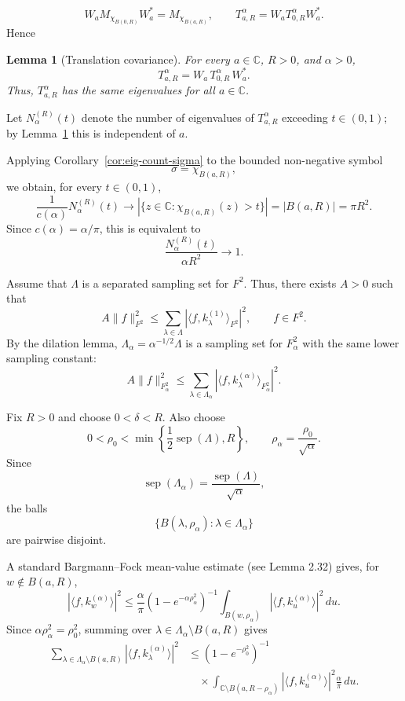 \documentclass{amsart}
\newtheorem{lem}[thm]{Lemma}
\theoremstyle{definition}
\theoremstyle{remark}
\numberwithin{equation}{section}
\newcommand{\C}{\mathbb{C}} %
\newcommand{\Weyl}{W}
\begin{document}
\[W_a M_{\chi_{B(0,R)}}W_a^*
=M_{\chi_{B(a,R)}},
\qquad
T_{a,R}^\alpha
=W_aT_{0,R}^\alpha W_a^*.\]
Hence

\begin{lem}[Translation covariance]
\label{lem:WeylBall}
For every $a\in\C$, $R>0$, and $\alpha>0$,
\[
T^\alpha_{a,R}
=\Weyl_{a}\,T^\alpha_{0,R}\,\Weyl_{a}^{*}.
\]
Thus, $T^\alpha_{a,R}$ has the same eigenvalues for all $a\in\C$.
\end{lem}

Let $N_\alpha^{(R)}(t)$ denote the number of eigenvalues of $T^\alpha_{a,R}$
exceeding $t\in(0,1)$; by Lemma~\ref{lem:WeylBall} this is independent of $a$.

Applying Corollary~\ref{cor:eig-count-sigma} to the bounded non-negative symbol
\[
\sigma=\chi_{B(a,R)},
\]
we obtain, for every $t\in(0,1)$,
\[
\frac{1}{c(\alpha)}
N_\alpha^{(R)}(t)
\longrightarrow
|\{z\in\mathbb C:\chi_{B(a,R)}(z)>t\}|
=
|B(a,R)|
=
\pi R^2.
\]
Since $c(\alpha)=\alpha/\pi$, this is equivalent to
\begin{equation}\label{eq:FockEigenvalueCounting}
\frac{N_\alpha^{(R)}(t)}{\alpha R^2}
\longrightarrow1.
\end{equation}



Assume that $\Lambda$ is a separated sampling set for $F^2$.
Thus, there exists $A>0$ such that
\[
A\|f\|_{F^2}^2
\leq
\sum_{\lambda\in\Lambda}
|\langle f,k_\lambda^{(1)}\rangle_{F^2}|^2,
\qquad
f\in F^2.
\]
By the dilation lemma, $\Lambda_\alpha
=\alpha^{-1/2}\Lambda$ is a sampling set for $F_\alpha^2$ with the
same lower sampling constant:
\[
A\|f\|_{F_\alpha^2}^2
\leq
\sum_{\lambda\in\Lambda_\alpha}
|\langle f,k_\lambda^{(\alpha)}\rangle_{F_\alpha^2}|^2.
\]

Fix $R>0$ and choose $0<\delta<R$. Also choose
\[
0<\rho_0<
\min\left\{\frac12\operatorname{sep}(\Lambda),R\right\},
\qquad
\rho_\alpha=\frac{\rho_0}{\sqrt{\alpha}}.
\]
Since
\[
\operatorname{sep}(\Lambda_\alpha)
=
\frac{\operatorname{sep}(\Lambda)}{\sqrt{\alpha}},
\]
the balls
\[
\{B(\lambda,\rho_\alpha):
\lambda\in\Lambda_\alpha\}
\]
are pairwise disjoint.

A standard Bargmann--Fock mean-value estimate (see \cite{Z12} Lemma 2.32) gives, for
$w\notin B(a,R)$,
\[
|\langle f,k_w^{(\alpha)}\rangle|^2
\leq
\frac{\alpha}{\pi}
\left(1-e^{-\alpha\rho_\alpha^2}\right)^{-1}
\int_{B(w,\rho_\alpha)}
|\langle f,k_u^{(\alpha)}\rangle|^2\,du.
\]
Since $\alpha\rho_\alpha^2=\rho_0^2$, summing over
$\lambda\in\Lambda_\alpha\setminus B(a,R)$ gives
\[
\begin{aligned}
\sum_{\lambda\in\Lambda_\alpha\setminus B(a,R)}
|\langle f,k_\lambda^{(\alpha)}\rangle|^2
&\leq
\left(1-e^{-\rho_0^2}\right)^{-1} \\
&\quad\times
\int_{\mathbb C\setminus B(a,R-\rho_\alpha)}
|\langle f,k_u^{(\alpha)}\rangle|^2
\frac{\alpha}{\pi}\,du.
\end{aligned}
\tag{6.2}
\]
\end{document}
